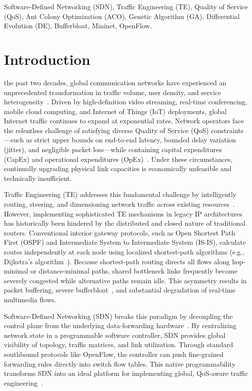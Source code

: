 \documentclass[journal]{IEEEtran}
\begin{document}
\begin{IEEEkeywords}
Software-Defined Networking (SDN), Traffic Engineering (TE), Quality of Service (QoS), Ant Colony Optimization (ACO), Genetic Algorithm (GA), Differential Evolution (DE), Bufferbloat, Mininet, OpenFlow.
\end{IEEEkeywords}

\section{Introduction}
 the past two decades, global communication networks have experienced an unprecedented transformation in traffic volume, user density, and service heterogeneity~\cite{kreutz2015software}. Driven by high-definition video streaming, real-time conferencing, mobile cloud computing, and Internet of Things (IoT) deployments, global Internet traffic continues to expand at exponential rates. Network operators face the relentless challenge of satisfying diverse Quality of Service (QoS) constraints---such as strict upper bounds on end-to-end latency, bounded delay variation (jitter), and negligible packet loss---while containing capital expenditures (CapEx) and operational expenditures (OpEx)~\cite{wang2008qos}. Under these circumstances, continually upgrading physical link capacities is economically unfeasible and technically insufficient. 

Traffic Engineering (TE) addresses this fundamental challenge by intelligently routing, steering, and dimensioning network traffic across existing resources~\cite{awduche2002overview, fortz2002traffic}. However, implementing sophisticated TE mechanisms in legacy IP architectures has historically been hindered by the distributed and closed nature of traditional routers. Conventional interior gateway protocols, such as Open Shortest Path First (OSPF) and Intermediate System to Intermediate System (IS-IS), calculate routes independently at each node using localized shortest-path algorithms (e.g., Dijkstra's algorithm~\cite{dijkstra1959note}). Because shortest-path routing directs all flows along hop-minimal or distance-minimal paths, shared bottleneck links frequently become severely congested while alternative paths remain idle. This asymmetry results in packet buffering, severe bufferbloat~\cite{gettys2011bufferbloat}, and substantial degradation of real-time multimedia flows.

Software-Defined Networking (SDN) breaks this paradigm by decoupling the control plane from the underlying data-forwarding hardware~\cite{mckeown2008openflow, nunes2014survey}. By centralizing network state in a programmable software controller, SDN provides global visibility of topology, traffic matrices, and link utilization. Through standard southbound protocols like OpenFlow, the controller can push fine-grained forwarding rules directly into switch flow tables. This native programmability transforms SDN into an ideal platform for implementing global, QoS-aware traffic engineering~\cite{kim2013improving, jain2013b4, hong2013achieving, agarwal2013traffic}.
\end{document}
